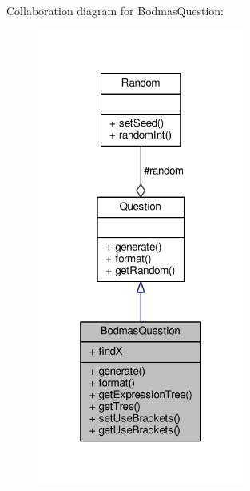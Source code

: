 Collaboration diagram for Bodmas\+Question\+:
\nopagebreak
\begin{figure}[H]
\begin{center}
\leavevmode
\includegraphics[width=193pt]{classBodmasQuestion__coll__graph}
\end{center}
\end{figure}
